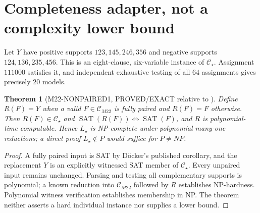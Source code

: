 \documentclass[10pt]{article}
\newtheorem{theorem}{Theorem}
\begin{document}
\section{Completeness adapter, not a complexity lower bound}
Let \(Y\) have positive supports \(123,145,246,356\) and negative supports \(124,136,235,456\). This is an eight-clause, six-variable instance of \(\mathcal C_\star\). Assignment \(111000\) satisfies it, and independent exhaustive testing of all \(64\) assignments gives precisely \(20\) models.
\begin{theorem}[M22-NONPAIRED1, PROVED/EXACT relative to \cite{docker}]
Define \(R(F)=Y\) when a valid \(F\in\mathcal C_{M22}\) is fully paired and \(R(F)=F\) otherwise. Then \(R(F)\in\mathcal C_\star\) and
\(\operatorname{SAT}(R(F))\iff\operatorname{SAT}(F)\), and \(R\) is polynomial-time computable. Hence \(L_\star\) is NP-complete under polynomial many-one reductions; a direct proof \(L_\star\notin P\) would suffice for \(P\ne NP\).
\end{theorem}
\begin{proof}
A fully paired input is SAT by D\"ocker's published corollary, and the replacement \(Y\) is an explicitly witnessed SAT member of \(\mathcal C_\star\). Every unpaired input remains unchanged. Parsing and testing all complementary supports is polynomial; a known reduction into \(\mathcal C_{M22}\) followed by \(R\) establishes NP-hardness. Polynomial witness verification establishes membership in NP. The theorem neither asserts a hard individual instance nor supplies a lower bound.
\end{proof}
\end{document}
